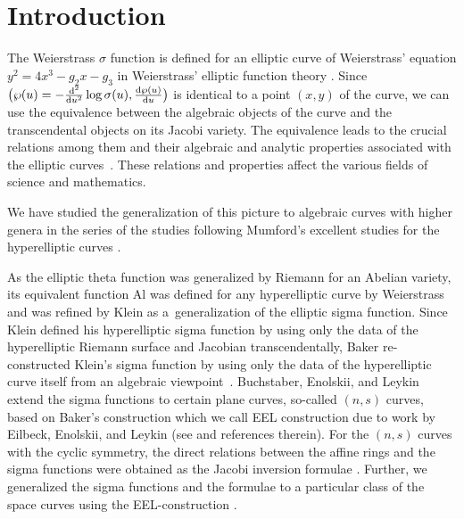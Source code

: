 \documentclass[pdftex]{sigma}
\numberwithin{equation}{section}
\begin{document}


\section{Introduction}\label{introduction}

The Weierstrass $\sigma$ function is defined for an elliptic curve of Weierstrass' equation $y^2 = 4 x^3 - g_2 x - g_3$ in Weierstrass' elliptic function theory \cite{WeiWV,WhittakerWatson}.
Since $\bigr(\wp(u)=-\frac{{\rm d}^2}{{\rm d} u^2}\log\sigma(u), \frac{{\rm d}\wp(u)}{{\rm d} u}\bigr)$ is identical to a point $(x,y)$ of the curve, we can use the equivalence between the algebraic objects of the curve and the transcendental objects on its Jacobi variety.
The equivalence leads to the crucial relations among them and their algebraic and analytic properties associated with the elliptic curves~\cite{WeiWV}. These relations and properties affect the various fields of science and mathematics.

We have studied the generalization of this picture to algebraic curves with higher genera in the series of the studies \cite{KM2020, KMP13, KMP16, KMP19} following Mumford's excellent studies for the hyperelliptic curves \cite{Mum81,Mum84}.

As the elliptic theta function was generalized by Riemann for an Abelian variety, its equivalent function Al was defined for any hyperelliptic curve by Weierstrass and was refined by Klein as a~generalization of the elliptic sigma function.
Since Klein defined his hyperelliptic sigma function by using only the data of the hyperelliptic Riemann surface and Jacobian transcendentally, Baker re-constructed Klein's sigma function by using only the data of the hyperelliptic curve itself from an algebraic viewpoint~\cite{Baker97}.
Buchstaber, Enolskii, and Leykin extend the sigma functions to certain plane curves, so-called $(n,s)$ curves, based on Baker's construction which we call EEL construction due to work by Eilbeck, Enolskii, and Leykin (see \cite{BEL20, EEL00} and references therein).
For the $(n,s)$ curves with the cyclic symmetry, the direct relations between the affine rings and the sigma functions were obtained as the Jacobi inversion formulae \cite{MP08, MP14}. Further, we generalized the sigma functions and the formulae to a particular class of the space curves using the EEL-construction \cite{KMP13, KMP19, MK13}.
\end{document}

